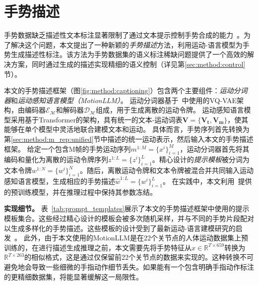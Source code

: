 \section{手势描述}
\label{sec:method:caption}
手势数据缺乏描述性文本标注显著限制了通过文本提示控制手势合成的能力~\cite{chen2024syntalker}。为了解决这个问题，本文提出了一种新颖的\textit{手势描述}方法，利用运动-语言模型为手势生成描述性标注。该方法为手势数据集的语义标注稀缺问题提供了一个高效的解决方案，同时通过生成的描述实现精细的语义控制（详见第\ref{sec:method:control}节）。

本文的手势描述框架（图\ref{fig:method:captioning}）包含两个主要组件：\textit{运动分词器}和\textit{运动感知语言模型（MotionLLM）}。
运动分词器基于~\cite{guo2022tm2t,zhang2023t2mgpt}中使用的VQ-VAE架构，由编码器$\mathcal{E_M}$和解码器$\mathcal{D_M}$组成，用于生成离散的运动令牌。
运动感知语言模型采用基于Transformer的架构，具有统一的文本-运动词表$\mathbf{V} = \{\mathbf{V_t}, \mathbf{V_m}\}$，使其能够在单个模型中灵活地联合建模文本和运动。
具体而言，手势序列首先转换为第\ref{sec:method:m_rep:unified}节中描述的统一运动表示，然后输入本文的手势描述框架。
给定一个包含M帧的手势运动序列$m^{1:M}=\{x^i\}^M_{i=1}$，运动分词器首先将其编码和量化为离散的运动令牌序列$z^{1:L}=\{z^i\}^L_{i=1}$。精心设计的\textit{提示模板}被分词为文本令牌$w^{1:N}=\{w^i\}^N_{i=1}$。随后，离散运动令牌和文本令牌被混合并共同输入运动感知语言模型，生成相应的手势描述$\hat{w}^{1:L}=\{w^i\}^L_{i=1}$。
在实践中，本文利用~\cite{jiang2024motiongpt}提供的预训练模型，并在推理过程中保持其参数冻结。

\textbf{实现细节。}
表~\ref{tab:prompt_templates}展示了本文的手势描述框架中使用的提示模板集合。这些经过精心设计的模板会被多次随机采样，并与不同的手势片段配对以生成多样化的手势描述。这些模板的设计受到了最新运动-语言建模研究的启发~\cite{jiang2024motiongpt}。
此外，由于本文使用的MotionLLM是在22个关节点的人体运动数据集上预训练的，在进行描述生成推理之前，本文需要先将手势特征从$x\in \mathbb{R}^{T\times 659}$转换为$\mathbb{R}^{T\times 263}$的相似格式，这是通过仅保留前22个关节点的数据来实现的。这种转换不可避免地会导致一些细微的手指动作细节丢失。如果能有一个包含明确手指动作标注的更精细数据集，将能显著缓解这一局限性。

